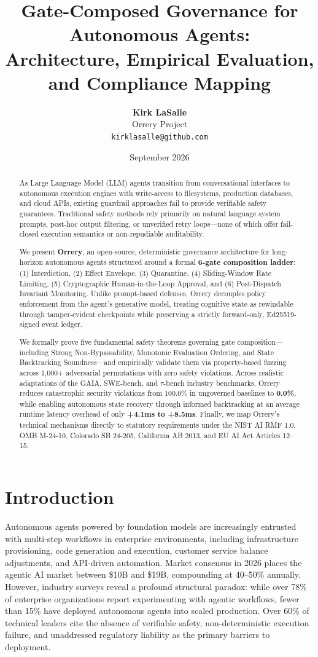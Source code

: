 \documentclass[11pt,a4paper]{article}
\title{\textbf{Gate-Composed Governance for Autonomous Agents:\\Architecture, Empirical Evaluation, and Compliance Mapping}}
\author{\textbf{Kirk LaSalle} \\ Orrery Project \\ \texttt{kirklasalle@github.com}}
\date{September 2026}
\begin{document}
\maketitle

\begin{abstract}
As Large Language Model (LLM) agents transition from conversational interfaces to autonomous execution engines with write-access to filesystems, production databases, and cloud APIs, existing guardrail approaches fail to provide verifiable safety guarantees. Traditional safety methods rely primarily on natural language system prompts, post-hoc output filtering, or unverified retry loops---none of which offer fail-closed execution semantics or non-repudiable auditability.

We present \textbf{Orrery}, an open-source, deterministic governance architecture for long-horizon autonomous agents structured around a formal \textbf{6-gate composition ladder}: (1) Interdiction, (2) Effect Envelope, (3) Quarantine, (4) Sliding-Window Rate Limiting, (5) Cryptographic Human-in-the-Loop Approval, and (6) Post-Dispatch Invariant Monitoring. Unlike prompt-based defenses, Orrery decouples policy enforcement from the agent's generative model, treating cognitive state as rewindable through tamper-evident checkpoints while preserving a strictly forward-only, Ed25519-signed event ledger.

We formally prove five fundamental safety theorems governing gate composition---including Strong Non-Bypassability, Monotonic Evaluation Ordering, and State Backtracking Soundness---and empirically validate them via property-based fuzzing across 1,000+ adversarial permutations with zero safety violations. Across realistic adaptations of the GAIA, SWE-bench, and $\tau$-bench industry benchmarks, Orrery reduces catastrophic security violations from 100.0\% in ungoverned baselines to \textbf{0.0\%}, while enabling autonomous state recovery through informed backtracking at an average runtime latency overhead of only \textbf{+4.1ms to +8.5ms}. Finally, we map Orrery's technical mechanisms directly to statutory requirements under the NIST AI RMF 1.0, OMB M-24-10, Colorado SB 24-205, California AB 2013, and EU AI Act Articles 12--15.
\end{abstract}

\section{Introduction}
Autonomous agents powered by foundation models are increasingly entrusted with multi-step workflows in enterprise environments, including infrastructure provisioning, code generation and execution, customer service balance adjustments, and API-driven automation. Market consensus in 2026 places the agentic AI market between \$10B and \$19B, compounding at 40--50\% annually. However, industry surveys reveal a profound structural paradox: while over 78\% of enterprise organizations report experimenting with agentic workflows, fewer than 15\% have deployed autonomous agents into scaled production. Over 60\% of technical leaders cite the absence of verifiable safety, non-deterministic execution failure, and unaddressed regulatory liability as the primary barriers to deployment.
\end{document}
